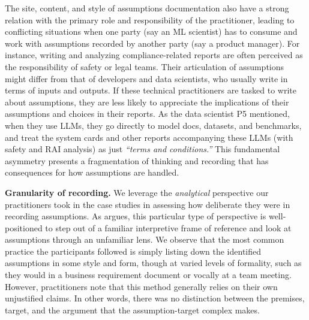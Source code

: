 The site, content, and style of assumptions documentation also have a strong relation with the primary role and responsibility of the practitioner, leading to conflicting situations when one party (say an ML scientist) has to consume and work with assumptions recorded by another party (say a product manager). For instance, writing and analyzing compliance-related reports are often perceived as the responsibility of safety or legal teams. Their articulation of assumptions might differ from that of developers and data scientists, who usually write in terms of inputs and outputs. If these technical practitioners are tasked to write about assumptions, they are less likely to appreciate the implications of their assumptions and choices in their reports. As the data scientist P5 mentioned, when they use LLMs, they go directly to model docs, datasets, and benchmarks, and treat the system cards and other reports accompanying these LLMs (with safety and RAI analysis) as just \textit{``terms and conditions.''} This fundamental asymmetry presents a fragmentation of thinking and recording that has consequences for how assumptions are handled. 



\smallskip 
\noindent \textbf{Granularity of recording.} We leverage the \textit{analytical} perspective our practitioners took in the case studies in assessing how deliberate they were in recording assumptions. As \citet{brookfield1992uncovering} argues, this particular type of perspective is well-positioned to step out of a familiar interpretive frame of reference and look at assumptions through an unfamiliar lens. We observe that the most common practice the participants followed is simply listing down the identified assumptions in some style and form, though at varied levels of formality, such as they would in a business requirement document or vocally at a team meeting. However, practitioners note that this method generally relies on their own unjustified claims. In other words, there was no distinction between the premises, target, and the argument that the assumption-target complex makes.

